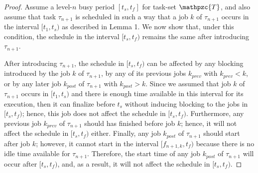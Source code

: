 \documentclass[fleqn]{article}
\begin{document}
%	

\begin{proof}
	Assume a level-$n$ busy period $[t_s,t_f]$ for task-set $\mathpzc{T}$, and also assume that task $\tau_{n+1}$ is scheduled in such a way that a job $k$ of $\tau_{n+1}$ occurs in the interval $[t_1,t_s)$ as described in Lemma 1. We now show that, under this condition, the schedule in the interval $[t_s,t_f)$ remains the same after introducing $\tau_{n+1}$.
	
	After introducing $\tau_{n+1}$, the schedule in $[t_s,t_f)$ can be affected by any blocking introduced by the job $k$ of $\tau_{n+1}$, by any of its previous jobs $k_{prev}$ with $k_{prev} < k$, or by any later job $k_{post}$ of $\tau_{n+1}$ with $k_{post} > k$. Since we assumed that job $k$ of $\tau_{n+1}$ occurs in $[t_1,t_s)$ and there is enough time available in this interval for its execution, then it can finalize before $t_s$ without inducing blocking to the jobs in $[t_s,t_f)$; hence, this job does not affect the schedule in $[t_s,t_f)$. Furthermore, any previous job $k_{prev}$ of $\tau_{n+1}$ should has finished before job $k$; hence, it will not affect the schedule in $[t_s,t_f)$ either. Finally, any job $k_{post}$ of $\tau_{n+1}$ should start after job $k$; however, it cannot start in the interval $[f_{n+1,k},t_f)$ because there is no idle time available for $\tau_{n+1}$. Therefore, the start time of any job $k_{post}$ of $\tau_{n+1}$ will occur after $[t_s,t_f)$, and, as a result, it will not affect the schedule in $[t_s,t_f)$.
\end{proof}
\end{document}
